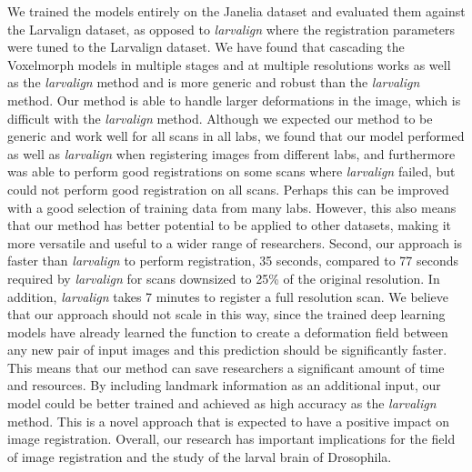 \documentclass{book}
\begin{document}
	We trained the models entirely on the Janelia dataset and evaluated them against the Larvalign dataset, as opposed to \textit{larvalign} where the registration parameters were tuned to the Larvalign dataset. We have found that cascading the Voxelmorph models in multiple stages and at multiple resolutions works as well as the \textit{larvalign} method and is more generic and robust than the \textit{larvalign} method. Our method is able to handle larger deformations in the image, which is difficult with the \textit{larvalign} method. Although we expected our method to be generic and work well for all scans in all labs, we found that our model performed as well as \textit{larvalign} when registering images from different labs, and furthermore was able to perform good registrations on some scans where \textit{larvalign} failed, but could not perform good registration on all scans. Perhaps this can be improved with a good selection of training data from many labs. However, this also means that our method has better potential to be applied to other datasets, making it more versatile and useful to a wider range of researchers. Second, our approach is faster than \textit{larvalign} to perform registration, 35 seconds, compared to 77 seconds required by \textit{larvalign} for scans downsized to 25\% of the original resolution. In addition, \textit{larvalign} takes 7 minutes to register a full resolution scan. We believe that our approach should not scale in this way, since the trained deep learning models have already learned the function to create a deformation field between any new pair of input images and this prediction should be significantly faster. This means that our method can save researchers a significant amount of time and resources. By including landmark information as an additional input, our model could be better trained and achieved as high accuracy as the \textit{larvalign} method. This is a novel approach that is expected to have a positive impact on image registration. Overall, our research has important implications for the field of image registration and the study of the larval brain of Drosophila.
	
\end{document}
